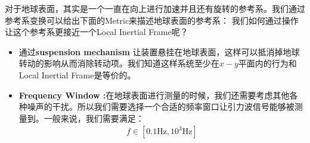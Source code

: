 对于地球表面，其实是一个一直在向上进行加速并且还有旋转的参考系。我们通过参考系变换可以给出下面的Metric来描述地球表面的参考系：
我们如何通过操作让这个参考系更接近一个Local Inertial Frame呢？
\begin{itemize}
  \item 通过\textbf{suspension mechanism}
    让装置悬挂在地球表面，这样可以抵消掉地球转动的影响从而消除转动项。我们知道这样系统至少在$ x-y $平面内的行为和Local
    Inertial Frame是等价的。
\end{itemize}
\begin{itemize}
  \item \textbf{Frequency Window
    :}在地球表面进行测量的时候，我们还需要考虑其他各种噪声的干扰。所以我们需要选择一个合适的频率窗口让引力波信号能够被测量到。一般来说，我们需要满足：
    \begin{align}
      f \in [0.1 \mathrm{Hz}, 10^3 \mathrm{Hz}]
    \end{align}
\end{itemize}

\bigskip
{}

